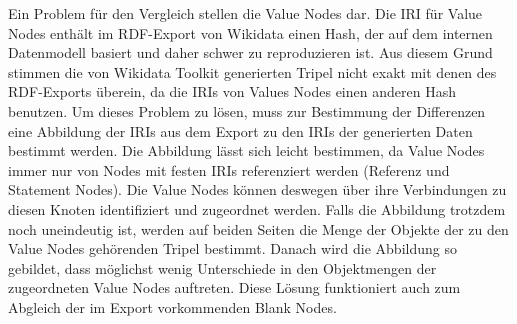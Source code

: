 Ein Problem für den Vergleich stellen die Value Nodes dar.
Die IRI für Value Nodes enthält im RDF-Export von Wikidata einen Hash, der auf dem internen Datenmodell basiert und daher schwer zu reproduzieren ist.
Aus diesem Grund stimmen die von Wikidata Toolkit generierten Tripel nicht exakt mit denen des RDF-Exports überein, da die IRIs von Values Nodes einen anderen Hash benutzen.
Um dieses Problem zu lösen, muss zur Bestimmung der Differenzen eine Abbildung der IRIs aus dem Export zu den IRIs der generierten Daten bestimmt werden.
Die Abbildung lässt sich leicht bestimmen, da Value Nodes immer nur von Nodes mit festen IRIs referenziert werden (Referenz und Statement Nodes).
Die Value Nodes können deswegen über ihre Verbindungen zu diesen Knoten identifiziert und zugeordnet werden.
Falls die Abbildung trotzdem noch uneindeutig ist, werden auf beiden Seiten die Menge der Objekte der zu den Value Nodes gehörenden Tripel bestimmt.
Danach wird die Abbildung so gebildet, dass möglichst wenig Unterschiede in den Objektmengen der zugeordneten Value Nodes auftreten.
Diese Lösung funktioniert auch zum Abgleich der im Export vorkommenden Blank Nodes.

